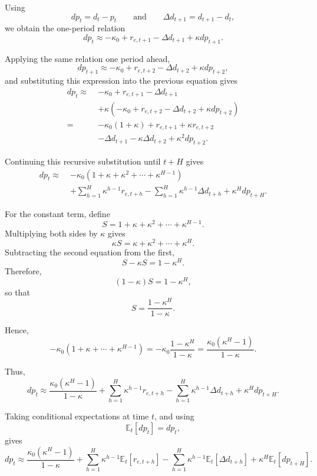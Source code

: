 \documentclass{article}
\begin{document}
Using
\[
dp_t=d_t-p_t
\qquad\text{and}\qquad
\Delta d_{t+1}=d_{t+1}-d_t,
\]
we obtain the one-period relation
\[
dp_t
\approx
-\kappa_0
+r_{e,t+1}
-\Delta d_{t+1}
+\kappa dp_{t+1}.
\]

Applying the same relation one period ahead,
\[
dp_{t+1}
\approx
-\kappa_0
+r_{e,t+2}
-\Delta d_{t+2}
+\kappa dp_{t+2},
\]
and substituting this expression into the previous equation gives
\begin{align*}
dp_t
\approx\;&
-\kappa_0
+r_{e,t+1}
-\Delta d_{t+1} \\
&+
\kappa
\left(
-\kappa_0
+r_{e,t+2}
-\Delta d_{t+2}
+\kappa dp_{t+2}
\right) \\
=\;&
-\kappa_0(1+\kappa)
+r_{e,t+1}
+\kappa r_{e,t+2} \\
&-
\Delta d_{t+1}
-\kappa\Delta d_{t+2}
+\kappa^2dp_{t+2}.
\end{align*}

Continuing this recursive substitution until \(t+H\) gives
\begin{align*}
dp_t
\approx\;&
-\kappa_0
\left(
1+\kappa+\kappa^2+\cdots+\kappa^{H-1}
\right) \\
&+
\sum_{h=1}^{H}\kappa^{h-1}r_{e,t+h}
-
\sum_{h=1}^{H}\kappa^{h-1}\Delta d_{t+h}
+
\kappa^Hdp_{t+H}.
\end{align*}

For the constant term, define
\[
S
=
1+\kappa+\kappa^2+\cdots+\kappa^{H-1}.
\]
Multiplying both sides by \(\kappa\) gives
\[
\kappa S
=
\kappa+\kappa^2+\cdots+\kappa^H.
\]
Subtracting the second equation from the first,
\[
S-\kappa S
=
1-\kappa^H.
\]
Therefore,
\[
(1-\kappa)S
=
1-\kappa^H,
\]
so that
\[
S
=
\frac{1-\kappa^H}{1-\kappa}.
\]

Hence,
\[
-\kappa_0
\left(
1+\kappa+\cdots+\kappa^{H-1}
\right)
=
-\kappa_0
\frac{1-\kappa^H}{1-\kappa}
=
\frac{\kappa_0(\kappa^H-1)}{1-\kappa}.
\]

Thus,
\begin{equation}
dp_t
\approx
\frac{\kappa_0(\kappa^H-1)}{1-\kappa}
+
\sum_{h=1}^{H}\kappa^{h-1}r_{e,t+h}
-
\sum_{h=1}^{H}\kappa^{h-1}\Delta d_{t+h}
+
\kappa^Hdp_{t+H}.
\tag{1.1}
\end{equation}

Taking conditional expectations at time \(t\), and using
\[
\mathbb{E}_t[dp_t]=dp_t,
\]
gives
\begin{equation}
dp_t
\approx
\frac{\kappa_0(\kappa^H-1)}{1-\kappa}
+
\sum_{h=1}^{H}\kappa^{h-1}
\mathbb{E}_t[r_{e,t+h}]
-
\sum_{h=1}^{H}\kappa^{h-1}
\mathbb{E}_t[\Delta d_{t+h}]
+
\kappa^H\mathbb{E}_t[dp_{t+H}].
\tag{1.2}
\end{equation}
\end{document}
